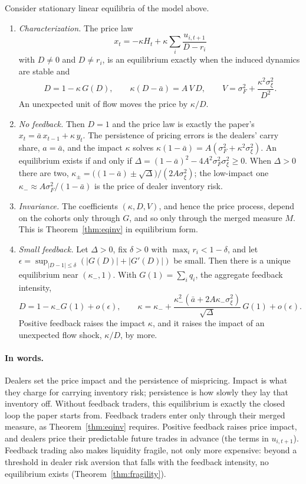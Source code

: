\begin{theorem}\label{thm:inventory}
Consider stationary linear equilibria of the model above.
\begin{enumerate}[label=(\roman*),itemsep=1pt]
\item \emph{Characterization.} The price law
\[
 x_t=-\kappa H_t+\kappa\sum_i\frac{u_{i,t+1}}{D-r_i}
\]
with $D\ne0$ and $D\ne r_i$, is an equilibrium exactly when the induced dynamics are stable and
\begin{equation}\label{eq:inventory_eq}
 D=1-\kappa\,G(D),\qquad \kappa(D-\bar a)=A\,V\,D,\qquad V=\sigma_F^2+\frac{\kappa^2\sigma_\xi^2}{D^2}.
\end{equation}
An unexpected unit of flow moves the price by $\kappa/D$.
\item \emph{No feedback.} Then $D=1$ and the price law is exactly the paper's $x_t=\bar a\,x_{t-1}+\kappa\,y_t$. The persistence of pricing errors is the dealers' carry share, $a=\bar a$, and the impact $\kappa$ solves $\kappa(1-\bar a)=A(\sigma_F^2+\kappa^2\sigma_\xi^2)$. An equilibrium exists if and only if $\Delta=(1-\bar a)^2-4A^2\sigma_F^2\sigma_\xi^2\ge0$. When $\Delta>0$ there are two, $\kappa_\pm=\bigl((1-\bar a)\pm\sqrt\Delta\bigr)/(2A\sigma_\xi^2)$; the low-impact one $\kappa_-\approx A\sigma_F^2/(1-\bar a)$ is the price of dealer inventory risk.
\item \emph{Invariance.} The coefficients $(\kappa,D,V)$, and hence the price process, depend on the cohorts only through $G$, and so only through the merged measure $M$. This is Theorem~\ref{thm:eqinv} in equilibrium form.
\item \emph{Small feedback.} Let $\Delta>0$, fix $\delta>0$ with $\max_ir_i<1-\delta$, and let $\epsilon=\sup_{|D-1|\le\delta}(|G(D)|+|G'(D)|)$ be small. Then there is a unique equilibrium near $(\kappa_-,1)$. With $G(1)=\sum_iq_i$, the aggregate feedback intensity,
\[
 D=1-\kappa_-G(1)+o(\epsilon),\qquad \kappa=\kappa_-+\frac{\kappa_-^2(\bar a+2A\kappa_-\sigma_\xi^2)}{\sqrt\Delta}\,G(1)+o(\epsilon).
\]
Positive feedback raises the impact $\kappa$, and it raises the impact of an unexpected flow shock, $\kappa/D$, by more.
\end{enumerate}
\end{theorem}

\paragraph{In words.} Dealers set the price impact and the persistence of mispricing. Impact is what they charge for carrying inventory risk; persistence is how slowly they lay that inventory off. Without feedback traders, this equilibrium is exactly the closed loop the paper starts from. Feedback traders enter only through their merged measure, as Theorem~\ref{thm:eqinv} requires. Positive feedback raises price impact, and dealers price their predictable future trades in advance (the terms in $u_{i,t+1}$). Feedback trading also makes liquidity fragile, not only more expensive: beyond a threshold in dealer risk aversion that falls with the feedback intensity, no equilibrium exists (Theorem~\ref{thm:fragility}).

